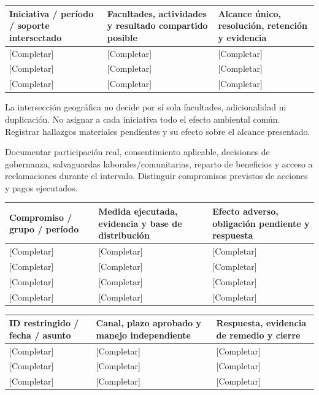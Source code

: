 {\sffamily\fontsize{8.6}{10.7}\selectfont\begin{longtable}{@{}P{48mm}P{61mm}P{53mm}@{}}
\toprule
\textbf{Iniciativa / período / soporte intersectado} & \textbf{Facultades, actividades y resultado compartido posible} & \textbf{Alcance único, resolución, retención y evidencia}\\\midrule\endhead
\rule{0pt}{8mm}[Completar] & [Completar] & [Completar]\\\hline
\rule{0pt}{8mm}[Completar] & [Completar] & [Completar]\\\hline
\rule{0pt}{8mm}[Completar] & [Completar] & [Completar]\\\hline
\end{longtable}}
La intersección geográfica no decide por sí sola facultades, adicionalidad ni duplicación. No asignar a cada iniciativa todo el efecto ambiental común. Registrar hallazgos materiales pendientes y su efecto sobre el alcance presentado.\par
{}
Documentar participación real, consentimiento aplicable, decisiones de gobernanza, salvaguardas laborales/comunitarias, reparto de beneficios y acceso a reclamaciones durante el intervalo. Distinguir compromisos previstos de acciones y pagos ejecutados.\par
{}
{\sffamily\fontsize{8.6}{10.7}\selectfont\begin{longtable}{@{}P{48mm}P{61mm}P{53mm}@{}}
\toprule
\textbf{Compromiso / grupo / período} & \textbf{Medida ejecutada, evidencia y base de distribución} & \textbf{Efecto adverso, obligación pendiente y respuesta}\\\midrule\endhead
\rule{0pt}{8mm}[Completar] & [Completar] & [Completar]\\\hline
\rule{0pt}{8mm}[Completar] & [Completar] & [Completar]\\\hline
\rule{0pt}{8mm}[Completar] & [Completar] & [Completar]\\\hline
\rule{0pt}{8mm}[Completar] & [Completar] & [Completar]\\\hline
\end{longtable}}
{\sffamily\fontsize{8.6}{10.7}\selectfont\begin{longtable}{@{}P{48mm}P{61mm}P{53mm}@{}}
\toprule
\textbf{ID restringido / fecha / asunto} & \textbf{Canal, plazo aprobado y manejo independiente} & \textbf{Respuesta, evidencia de remedio y cierre}\\\midrule\endhead
\rule{0pt}{8mm}[Completar] & [Completar] & [Completar]\\\hline
\rule{0pt}{8mm}[Completar] & [Completar] & [Completar]\\\hline
\rule{0pt}{8mm}[Completar] & [Completar] & [Completar]\\\hline
\end{longtable}}
